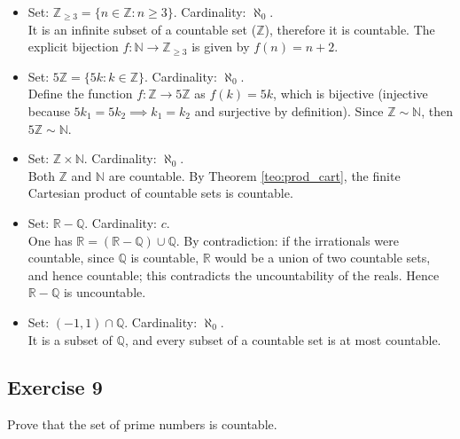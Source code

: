\documentclass[11pt, a4paper]{article}
\begin{document}
\begin{itemize}
    \item Set: $\mathbb{Z}_{\ge 3} = \{ n \in \mathbb{Z} : n \ge 3 \}$.
    Cardinality: $\aleph_0$.
    \\ It is an infinite subset of a countable set ($\mathbb{Z}$), therefore it is
    countable. The explicit bijection $f: \mathbb{N} \to \mathbb{Z}_{\ge 3}$ is given
    by $f(n) = n + 2$.

    \item Set: $5\mathbb{Z} = \{ 5k : k \in \mathbb{Z} \}$.
    Cardinality: $\aleph_0$.
    \\ Define the function $f: \mathbb{Z} \to 5\mathbb{Z}$ as $f(k) = 5k$, which is bijective
    (injective because $5k_1=5k_2 \implies k_1=k_2$ and surjective by definition). Since
    $\mathbb{Z} \sim \mathbb{N}$, then $5\mathbb{Z} \sim \mathbb{N}$.

    \item Set: $\mathbb{Z} \times \mathbb{N}$.
    Cardinality: $\aleph_0$.
    \\ Both $\mathbb{Z}$ and $\mathbb{N}$ are countable. By Theorem \ref{teo:prod_cart}, the
    finite Cartesian product of countable sets is countable.

    \item Set: $\mathbb{R} - \mathbb{Q}$.
    Cardinality: $c$.
    \\ One has $\mathbb{R} = (\mathbb{R} - \mathbb{Q}) \cup \mathbb{Q}$. By contradiction: if the irrationals were
    countable, since $\mathbb{Q}$ is countable, $\mathbb{R}$ would be a union of two countable sets, and
    hence countable; this contradicts the uncountability of the reals. Hence
    $\mathbb{R} - \mathbb{Q}$ is uncountable.

    \item Set: $(-1, 1) \cap \mathbb{Q}$.
    Cardinality: $\aleph_0$.
    \\ It is a subset of $\mathbb{Q}$, and every subset of a countable set is at most
    countable.
\end{itemize}

\subsection*{Exercise 9}

Prove that the set of prime numbers is countable.
\end{document}
